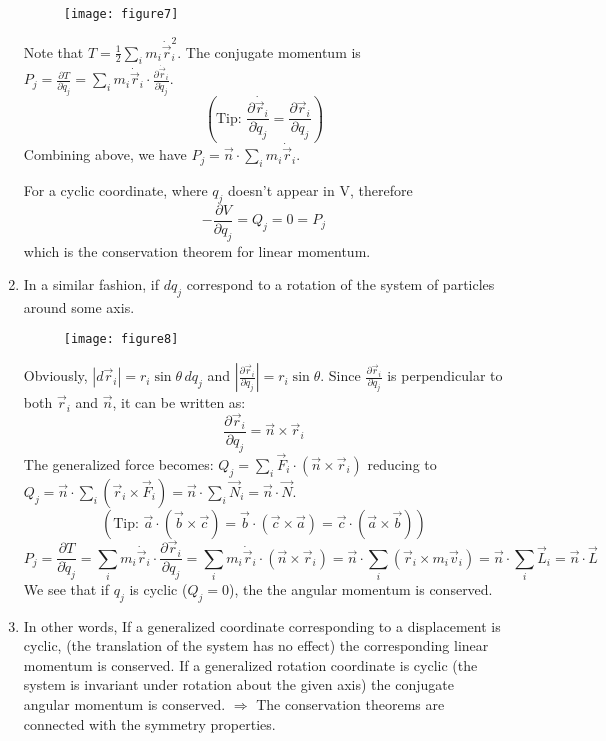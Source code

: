 \documentclass[12pt]{article}
\begin{document}
\begin{enumerate}
    	\begin{figure}[h]
    		\centering
    		\texttt{[image: figure7]}
    		\caption{}
    		\label{fig:figure7}
    	\end{figure}
    	
    	Note that $T = \frac{1}{2} \sum_i m_i \dot{\vec{r}}_i^2$.
    	The conjugate momentum is $P_j = \frac{\partial T}{\partial \dot{q}_j} = \sum_i m_i \dot{\vec{r}}_i \cdot \frac{\partial \dot{\vec{r}}_i}{\partial \dot{q}_j}$.
    	$$ \left( \text{Tip: } \frac{\partial \dot{\vec{r}}_i}{\partial \dot{q}_j} = \frac{\partial \vec{r}_i}{\partial q_j} \right) $$
    	Combining above, we have $P_j = \vec{n} \cdot \sum_i m_i \dot{\vec{r}}_i$.
    	
    	For a cyclic coordinate, where $q_j$ doesn't appear in V, therefore
    	$$ -\frac{\partial V}{\partial q_j} = Q_j = 0 = P_j $$
    	which is the conservation theorem for linear momentum.
    	
    	\item In a similar fashion, if $dq_j$ correspond to a rotation of the system of particles around some axis. 
    	 
        \begin{figure}[h]
        	\centering
        	\texttt{[image: figure8]}
        	\caption{}
        	\label{fig:figure8}
        \end{figure}
        
    	Obviously, $|d\vec{r}_i| = r_i \sin\theta \, dq_j$ and $|\frac{\partial \vec{r}_i}{\partial q_j}| = r_i \sin\theta$.
    	Since $\frac{\partial \vec{r}_i}{\partial q_j}$ is perpendicular to both $\vec{r}_i$ and $\vec{n}$, it can be written as:
    	$$ \frac{\partial \vec{r}_i}{\partial q_j} = \vec{n} \times \vec{r}_i $$
    	The generalized force becomes: $Q_j = \sum_i \vec{F}_i \cdot (\vec{n} \times \vec{r}_i)$ reducing to $Q_j = \vec{n} \cdot \sum_i (\vec{r}_i \times \vec{F}_i) = \vec{n} \cdot \sum_i \vec{N}_i = \vec{n} \cdot \vec{N}$.
    	$$ (\text{Tip: } \vec{a} \cdot (\vec{b} \times \vec{c}) = \vec{b} \cdot (\vec{c} \times \vec{a}) = \vec{c} \cdot (\vec{a} \times \vec{b})) $$
    	$$ P_j = \frac{\partial T}{\partial \dot{q}_j} = \sum_i m_i \dot{\vec{r}}_i \cdot \frac{\partial \vec{r}_i}{\partial q_j} = \sum_i m_i \dot{\vec{r}}_i \cdot (\vec{n} \times \vec{r}_i) = \vec{n} \cdot \sum_i (\vec{r}_i \times m_i \vec{v}_i) = \vec{n} \cdot \sum_i \vec{L}_i = \vec{n} \cdot \vec{L} $$
    	We see that if $q_j$ is cyclic ($Q_j = 0$), the the angular momentum is conserved.
    	
    	\item In other words,
    	If a generalized coordinate corresponding to a displacement is cyclic, (the translation of the system has no effect) the corresponding linear momentum is conserved.
    	If a generalized rotation coordinate is cyclic (the system is invariant under rotation about the given axis) the conjugate angular momentum is conserved.
    	$\Rightarrow$ The conservation theorems are connected with the symmetry properties.
    \end{enumerate}
    
\end{document}
